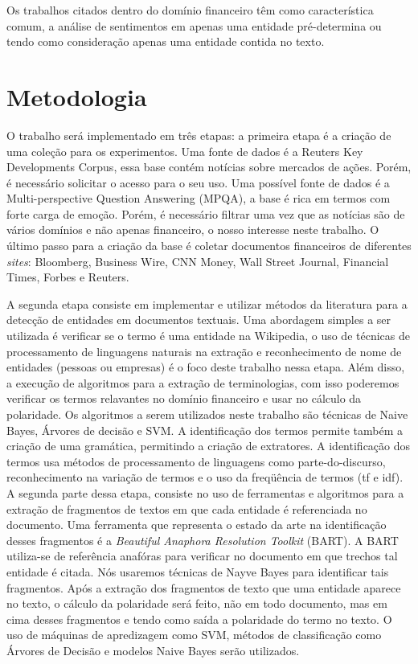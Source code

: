 \documentclass[a4paper,12pt]{article}
\begin{document}
Os trabalhos citados dentro do domínio financeiro têm como característica comum, a análise de sentimentos em apenas uma entidade pré-determina ou tendo como consideração apenas uma entidade contida no texto.

\section{Metodologia}

O trabalho será implementado em três etapas: a primeira etapa é a criação de uma coleção para os experimentos. Uma fonte de dados é a Reuters Key Developments Corpus, essa base contém notícias sobre mercados de ações. Porém, é necessário solicitar o acesso para o seu uso. Uma possível fonte de dados é a Multi-perspective Question Answering (MPQA), a base é rica em termos com forte carga de emoção. Porém, é necessário filtrar uma vez que as notícias são de vários domínios e não apenas financeiro, o nosso interesse neste trabalho. O último passo para a criação da base é coletar documentos financeiros de diferentes \textit{sites}: Bloomberg, Business Wire, CNN Money, Wall Street Journal, Financial Times, Forbes e Reuters.

A segunda etapa consiste em implementar e utilizar métodos da literatura para a detecção de entidades em documentos textuais. Uma abordagem simples a ser utilizada é verificar se o termo é uma entidade na Wikipedia, o uso de técnicas de processamento de linguagens naturais na extração e reconhecimento de nome de entidades (pessoas ou empresas) é o foco deste trabalho nessa etapa. Além disso, a execução de algoritmos para a extração de terminologias, com isso poderemos verificar os termos relavantes no domínio financeiro e usar no cálculo da polaridade. Os algoritmos a serem utilizados neste trabalho são técnicas de Naive Bayes, Árvores de decisão e SVM. A identificação dos termos permite também a criação de uma gramática, permitindo a criação de extratores. A identificação dos termos usa métodos de processamento de linguagens como parte-do-discurso, reconhecimento na variação de termos e o uso da freqüência de termos (tf e idf). A segunda parte dessa etapa, consiste no uso de ferramentas e algoritmos para a extração de fragmentos de textos em que cada entidade é referenciada no documento. Uma ferramenta que representa o estado da arte na identificação desses fragmentos é a \textit{Beautiful Anaphora Resolution Toolkit} (BART). A BART utiliza-se de referência anafóras para verificar no documento em que trechos tal entidade é citada. Nós usaremos técnicas de Nayve Bayes para identificar tais fragmentos. Após a extração dos fragmentos de texto que uma entidade aparece no texto, o cálculo da polaridade será feito, não em todo documento, mas em cima desses fragmentos e tendo como saída a polaridade do termo no texto. O uso de máquinas de apredizagem como SVM, métodos de classificação como Árvores de Decisão e modelos Naive Bayes serão utilizados.
\end{document}
